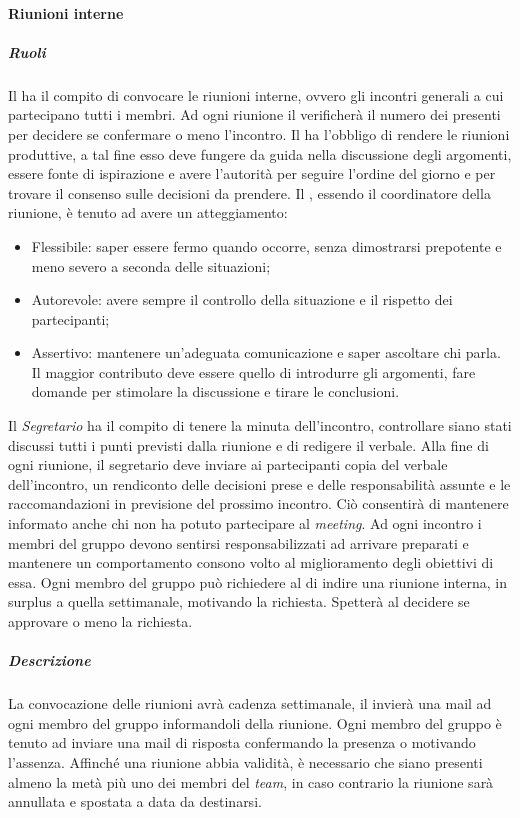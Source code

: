  
\paragraph{Riunioni interne}
\subparagraph{Ruoli}
Il \textit{\RdP} ha il compito di convocare le riunioni interne, ovvero gli incontri generali a cui partecipano tutti i membri.
Ad ogni riunione il \textit{\RdP} verificherà il numero dei presenti per decidere se confermare o meno l'incontro.
Il \textit{\RdP} ha l'obbligo di rendere le riunioni produttive, a tal fine 
esso deve fungere da guida nella discussione degli argomenti, essere fonte di ispirazione e avere l'autorità per seguire l'ordine del giorno e per trovare il consenso sulle decisioni da prendere.
Il \textit{\RdP}, essendo il coordinatore della riunione, è tenuto ad avere un atteggiamento:
\begin{itemize}
\item
Flessibile: saper essere fermo quando occorre, senza dimostrarsi prepotente e meno severo a seconda delle situazioni;
\item
Autorevole: avere sempre il controllo della situazione e il rispetto dei partecipanti;
\item
Assertivo: mantenere un'adeguata comunicazione e saper ascoltare chi parla. Il maggior contributo deve essere quello di introdurre gli argomenti, fare domande per stimolare la discussione e tirare le conclusioni.
\end{itemize}
Il \textit{Segretario} ha il compito di tenere la minuta dell'incontro, controllare siano stati discussi tutti i punti previsti dalla riunione e di redigere
il verbale. Alla fine di ogni riunione, il segretario deve inviare ai partecipanti copia del verbale dell'incontro, un rendiconto delle decisioni prese e delle responsabilità assunte e le raccomandazioni in previsione del prossimo incontro. Ciò consentirà di mantenere informato anche chi non ha potuto partecipare al \textit{meeting}. 
Ad ogni incontro i membri del gruppo devono sentirsi responsabilizzati ad arrivare preparati e mantenere un comportamento consono volto al miglioramento degli obiettivi di essa.
Ogni membro del gruppo può richiedere al \textit{\RdP} di indire una riunione interna, in surplus a quella settimanale, motivando la richiesta. Spetterà al \textit{\RdP} decidere se approvare o meno la richiesta.
\subparagraph{Descrizione}
La convocazione delle riunioni avrà cadenza settimanale, il \textit{\RdP} invierà una mail ad ogni membro del gruppo informandoli della riunione.
Ogni membro del gruppo è tenuto ad inviare una mail di risposta confermando la presenza o motivando l'assenza.
Affinché una riunione abbia validità, è necessario che siano presenti almeno la metà più uno dei membri del \textit{team}, in caso contrario la riunione sarà annullata e spostata a data da destinarsi.

